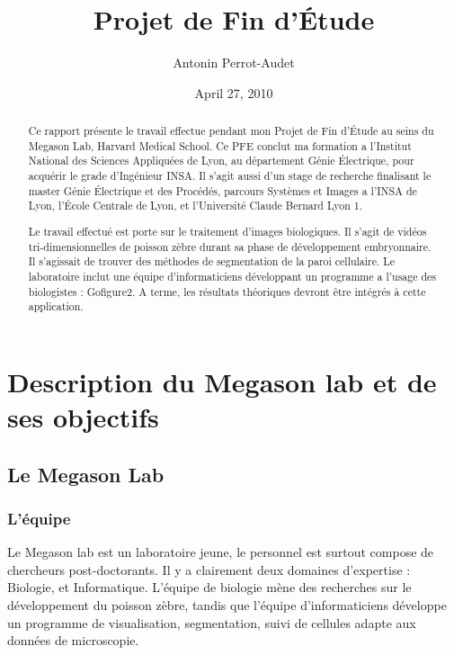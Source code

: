 




\title{Projet de Fin d'Étude}   %
\author{Antonin Perrot-Audet}         %
\date{April 27, 2010}    %
\maketitle

\begin{abstract}
  Ce rapport présente le travail effectue pendant mon Projet de Fin d'Étude au seins du Megason Lab, Harvard Medical School. Ce PFE conclut ma formation a l'Institut National des Sciences Appliquées de Lyon, au département Génie Électrique, pour acquérir le grade d'Ingénieur INSA. Il s'agit aussi d'un stage de recherche finalisant le master Génie Électrique et des Procédés, parcours Systèmes et Images a l'INSA de Lyon, l'École Centrale de Lyon, et l'Université Claude Bernard Lyon 1.
  
  Le travail effectué est porte sur le traitement d'images biologiques. Il s'agit de vidéos tri-dimensionnelles de poisson zèbre durant sa phase de développement embryonnaire. Il s'agissait de trouver des méthodes de segmentation de la paroi cellulaire. Le laboratoire inclut une équipe d'informaticiens développant un programme a l'usage des biologistes : Gofigure2. A terme, les résultats théoriques devront être intégrés à cette application.
  
  
\tableofcontents  
  
 
\end{abstract}



\chapter{Description du Megason lab et de ses objectifs} 

\section{Le Megason Lab}

\subsection{L'équipe}
Le Megason lab est un laboratoire jeune, le personnel est surtout compose de chercheurs post-doctorants. Il y a clairement deux domaines d'expertise : Biologie, et Informatique. L'équipe de biologie mène des recherches sur le développement du poisson zèbre, tandis que l'équipe d'informaticiens développe un programme de visualisation, segmentation, suivi de cellules adapte aux données de microscopie.


